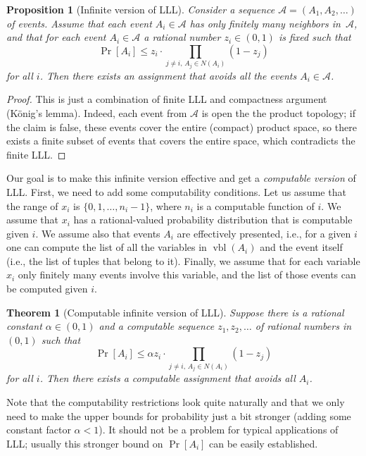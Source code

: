 \documentclass[12pt]{article}
\DeclareMathOperator{\vbl}{\mathrm{vbl}}
\newtheorem{theorem}{Theorem}
\newtheorem{proposition}{Proposition}
\begin{document}
\begin{proposition}[Infinite version of LLL]
     \label{infinite}
Consider a sequence $\mathcal{A}=(A_1,A_2,\ldots)$ of events. Assume that each event $A_i\in\mathcal{A}$ has only finitely many neighbors in~$\mathcal{A}$, and that for each event $A_i\in\mathcal{A}$ a rational number $z_i\in (0,1)$ is fixed such that
    $$
\Pr [A_i]\le z_i\cdot\!\!\!\!\!\!\!\!\!\!\prod_{j\ne i,\, A_j\in N(A_i)}(1-z_j)
    $$
for all $i$. Then there exists an assignment that avoids all the events $A_i\in\mathcal{A}$.
\end{proposition}

\begin{proof}
This is just a combination of finite LLL and compactness argument (K\"onig's lemma). Indeed, each event from $\mathcal{A}$ is open the the product topology; if the claim
is false, these events cover the entire (compact) product space, so there exists
a finite subset of events that covers the entire space, which contradicts the
finite LLL.
\end{proof}

Our goal is to make this infinite version effective and get a \emph{computable version} of LLL.  First, we need to add some computability conditions. Let us assume that the range of $x_i$ is $\{0,1,\ldots,n_i-1\}$, where $n_i$ is a computable function of $i$. We assume that $x_i$ has a rational-valued probability distribution that is computable given $i$. We assume also that events  $A_i$ are effectively presented, i.e., for a given $i$ one can compute the list of all the variables in $\vbl(A_i)$ and the event itself (i.e., the list of tuples that belong to it).  Finally, we assume that for each variable $x_i$ only finitely many events involve this variable, and the list of those events can be computed given $i$.

\begin{theorem}[Computable infinite version of LLL]
\label{computablelll}
Suppose there is a rational constant $\alpha\in(0,1)$ and a
computable sequence $z_1,z_2,\ldots$ of rational numbers in $(0,1)$ such that
     $$
\Pr [A_i]\le \alpha z_i\cdot\!\!\!\!\!\!\!\!\prod_{j\ne i,\, A_j\in N(A_i)}(1-z_j)
    $$
for all $i$. Then there exists a computable assignment that
avoids all $A_i$.
\end{theorem}

Note that the computability restrictions look quite naturally and that we only need
to make the upper bounds for probability just a bit stronger (adding some constant factor $\alpha<1$). It should not be a problem for typical applications of LLL; usually this stronger bound on $\Pr[A_i]$ can be easily established.
\end{document}
